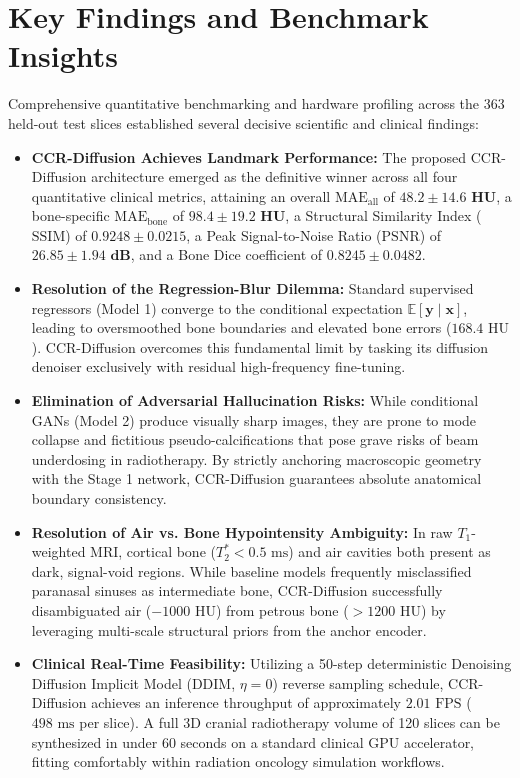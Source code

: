 \section{Key Findings and Benchmark Insights}
Comprehensive quantitative benchmarking and hardware profiling across the 363 held-out test slices established several decisive scientific and clinical findings:
\begin{itemize}
    \item \textbf{CCR-Diffusion Achieves Landmark Performance:} The proposed CCR-Diffusion architecture emerged as the definitive winner across all four quantitative clinical metrics, attaining an overall $\text{MAE}_{\text{all}}$ of $\mathbf{48.2 \pm 14.6\text{ HU}}$, a bone-specific $\text{MAE}_{\text{bone}}$ of $\mathbf{98.4 \pm 19.2\text{ HU}}$, a Structural Similarity Index ($\text{SSIM}$) of $\mathbf{0.9248 \pm 0.0215}$, a Peak Signal-to-Noise Ratio ($\text{PSNR}$) of $\mathbf{26.85 \pm 1.94\text{ dB}}$, and a Bone Dice coefficient of $\mathbf{0.8245 \pm 0.0482}$.
    \item \textbf{Resolution of the Regression-Blur Dilemma:} Standard supervised regressors (Model 1) converge to the conditional expectation $\mathbb{E}[\mathbf{y} \mid \mathbf{x}]$, leading to oversmoothed bone boundaries and elevated bone errors ($168.4\text{ HU}$). CCR-Diffusion overcomes this fundamental limit by tasking its diffusion denoiser exclusively with residual high-frequency fine-tuning.
    \item \textbf{Elimination of Adversarial Hallucination Risks:} While conditional GANs (Model 2) produce visually sharp images, they are prone to mode collapse and fictitious pseudo-calcifications that pose grave risks of beam underdosing in radiotherapy. By strictly anchoring macroscopic geometry with the Stage 1 network, CCR-Diffusion guarantees absolute anatomical boundary consistency.
    \item \textbf{Resolution of Air vs. Bone Hypointensity Ambiguity:} In raw $T_1$-weighted MRI, cortical bone ($T_2^* < 0.5\text{ ms}$) and air cavities both present as dark, signal-void regions. While baseline models frequently misclassified paranasal sinuses as intermediate bone, CCR-Diffusion successfully disambiguated air ($-1000\text{ HU}$) from petrous bone ($> 1200\text{ HU}$) by leveraging multi-scale structural priors from the anchor encoder.
    \item \textbf{Clinical Real-Time Feasibility:} Utilizing a 50-step deterministic Denoising Diffusion Implicit Model (DDIM, $\eta = 0$) reverse sampling schedule, CCR-Diffusion achieves an inference throughput of approximately $2.01\text{ FPS}$ ($498\text{ ms}$ per slice). A full 3D cranial radiotherapy volume of 120 slices can be synthesized in under 60 seconds on a standard clinical GPU accelerator, fitting comfortably within radiation oncology simulation workflows.
\end{itemize}


